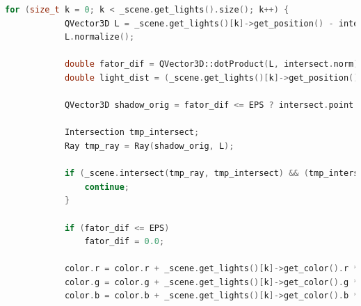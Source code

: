 \begin{lstlisting}[label=raytracing2,caption=Реализация алгоритма испускания луча (продолжение), language=C++]
		for (size_t k = 0; k < _scene.get_lights().size(); k++) {
			QVector3D L = _scene.get_lights()[k]->get_position() - intersect.point;
			L.normalize();
			
			double fator_dif = QVector3D::dotProduct(L, intersect.norm);
			double light_dist = (_scene.get_lights()[k]->get_position() - intersect.point).length();
			
			QVector3D shadow_orig = fator_dif <= EPS ? intersect.point - intersect.norm * 1e-3 : intersect.point + intersect.norm * 1e-3;
			
			Intersection tmp_intersect;
			Ray tmp_ray = Ray(shadow_orig, L);
			
			if (_scene.intersect(tmp_ray, tmp_intersect) && (tmp_intersect.point - shadow_orig).length() < light_dist && fabs(tmp_intersect.material.get_k_refr()) < EPS) {
				continue;
			}
			
			if (fator_dif <= EPS)
				fator_dif = 0.0;
			
			color.r = color.r + _scene.get_lights()[k]->get_color().r * _scene.get_lights()[k]->get_intensity() * fator_dif * intersect.material.get_diffuse().r * intersect.material.get_kd();
			color.g = color.g + _scene.get_lights()[k]->get_color().g * _scene.get_lights()[k]->get_intensity() * fator_dif * intersect.material.get_diffuse().g * intersect.material.get_kd();
			color.b = color.b + _scene.get_lights()[k]->get_color().b * _scene.get_lights()[k]->get_intensity() * fator_dif * intersect.material.get_diffuse().b * intersect.material.get_kd();
\end{lstlisting}
\clearpage
